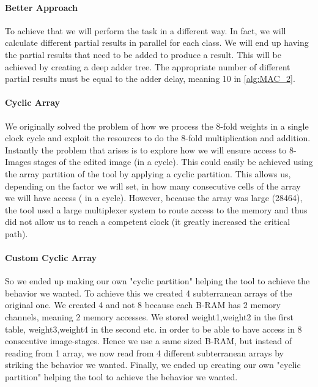 \paragraph {Better Approach}To achieve that we will perform the task in a different way. In fact, we will calculate different partial results in parallel for each class. We will end up having the partial results that need to be added to produce a result. This will be achieved by creating a deep adder tree. The appropriate number of different partial results must be equal to the adder delay, meaning 10 in \ref{alg:MAC_2}.

\paragraph {Cyclic Array}
We originally solved the problem of how we process the 8-fold weights in a single clock cycle and exploit the resources to do the 8-fold multiplication and addition. Instantly the problem that arises is to explore how we will ensure access to 8-Images stages of the edited image (in a cycle). This could easily be achieved using the array partition of the tool by applying a cyclic partition. This allows us, depending on the factor we will set, in how many consecutive cells of the array we will have access ( in a cycle). However, because the array was large (28464), the tool used a large multiplexer system to route access to the memory and thus did not allow us to reach a competent clock (it greatly increased the critical path).

\paragraph {Custom Cyclic Array}
So we ended up making our own "cyclic partition" helping the tool to achieve the behavior we wanted. To achieve this we created 4 subterranean arrays of the original one. We created 4 and not 8 because each B-RAM has 2 memory channels, meaning 2 memory accesses. We stored weight1,weight2 in the first table, weight3,weight4 in the second etc. in order to be able to have access in 8 consecutive image-stages. Hence we use a same sized B-RAM, but instead of reading from 1 array, we now read from 4 different subterranean arrays by striking the behavior we wanted. Finally, we ended up creating our own "cyclic partition" helping the tool to achieve the behavior we wanted.

